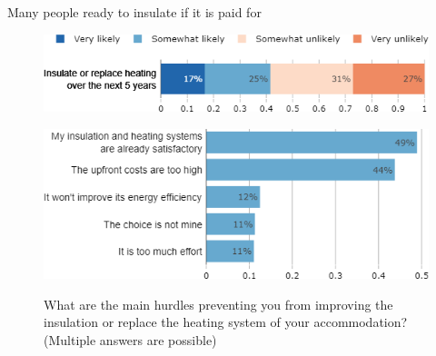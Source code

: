 \begin{framefont}{\small}
\begin{frame}{Many people ready to insulate if it is paid for}%
\vspace{-.5cm}
\begin{figure}[h!]
\caption{How likely is it that you will improve the insulation or replace the heating system of your accommodation over the next 5 years?}
\includegraphics[width=.52\paperwidth]{../figures/FR/will_insulate_FR.png} \\
\vspace{.1cm}
\caption{What are the main hurdles preventing you from improving the insulation or replace the heating system of your accommodation? (Multiple answers are possible)}
\includegraphics[width=.47\paperwidth]{../figures/FR/obstacles_insulation_FR.png}\\
\end{figure}
\end{frame}


\end{framefont}
